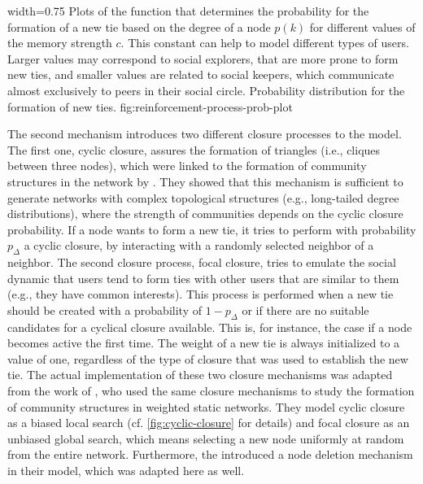       {width=0.75\textwidth}
      {Plots of the function that determines the probability for the formation of a new tie based on the degree of a node \( p(k) \) for different values of the memory strength \( c \). This constant can help to model different types of users. Larger values may correspond to social explorers, that are more prone to form new ties, and smaller values are related to social keepers, which communicate almost exclusively to peers in their social circle.}
      {Probability distribution for the formation of new ties.}
      {fig:reinforcement-process-prob-plot}


The second mechanism introduces two different closure processes to the model.
The first one, cyclic closure, assures the formation of triangles (i.e., cliques between three nodes), which were linked to the formation of community structures in the network by \citet{Bianconi2014}.
They showed that this mechanism is sufficient to generate networks with complex topological structures (e.g., long-tailed degree distributions), where the strength of communities depends on the cyclic closure probability.
If a node wants to form a new tie, it tries to perform with probability \( p_{\Delta} \) a cyclic closure, by interacting with a randomly selected neighbor of a neighbor.
The second closure process, focal closure, tries to emulate the social dynamic that users tend to form ties with other users that are similar to them (e.g., they have common interests).
This process is performed when a new tie should be created with a probability of \( 1 - p_{\Delta} \) or if there are no suitable candidates for a cyclical closure available.
This is, for instance, the case if a node becomes active the first time.
The weight of a new tie is always initialized to a value of one, regardless of the type of closure that was used to establish the new tie.
The actual implementation of these two closure mechanisms was adapted from the work of \citet{Kumpula2007}, who used the same closure mechanisms to study the formation of community structures in weighted static networks.
They model cyclic closure as a biased local search (cf. \autoref{fig:cyclic-closure} for details) and focal closure as an unbiased global search, which means selecting a new node uniformly at random from the entire network.
Furthermore, the introduced a node deletion mechanism in their model, which was adapted here as well.



